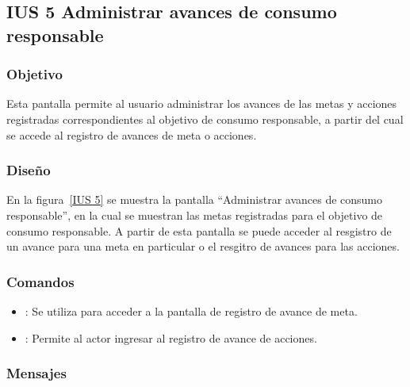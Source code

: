 \subsection{IUS 5 Administrar avances de consumo responsable}

\subsubsection{Objetivo}
    
Esta pantalla permite al usuario  administrar los avances de las metas y acciones registradas correspondientes al objetivo de consumo responsable, a partir del cual se accede al registro de avances de meta o acciones.

\subsubsection{Diseño}

    En la figura~\ref{IUS 5} se muestra la pantalla ``Administrar avances de consumo responsable'', en la cual se muestran las metas registradas para el objetivo de consumo responsable. A partir de esta pantalla se puede acceder al resgistro de un avance para una meta en particular o el resgitro de avances para las acciones. 



\subsubsection{Comandos}
    \begin{itemize}
    \item {}: Se utiliza para acceder a la pantalla de registro de avance de meta.
    \item {}: Permite al actor ingresar al registro de avance de acciones.
    \end{itemize}

\subsubsection{Mensajes}

